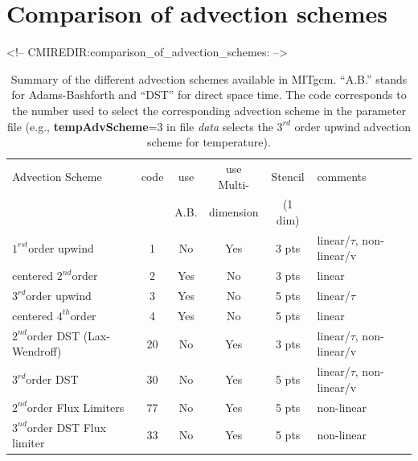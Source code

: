 \section{Comparison of advection schemes}
\label{sec:tracer_advection_schemes}
\begin{rawhtml}
<!-- CMIREDIR:comparison_of_advection_schemes: -->
\end{rawhtml}

\begin{table}[htb]
\centering
 \begin{tabular}[htb]{|l|c|c|c|c|l|}
   \hline
   Advection Scheme & code & use  & use Multi- & Stencil & comments \\
                    &      & A.B. & dimension & (1 dim) & \\
   \hline \hline
   $1^{rst}$order upwind  & 1 &  No & Yes & 3 pts & linear/$\tau$, non-linear/v\\
   \hline
   centered $2^{nd}$order & 2 &  Yes & No & 3 pts & linear \\
   \hline
   $3^{rd}$order upwind   & 3 &  Yes & No & 5 pts & linear/$\tau$\\
   \hline
   centered $4^{th}$order & 4 &  Yes & No & 5 pts & linear \\
   \hline \hline
   $2^{nd}$order DST (Lax-Wendroff)  & 20 &
                         No & Yes & 3 pts & linear/$\tau$, non-linear/v\\
   \hline
   $3^{rd}$order DST & 30 &  No & Yes & 5 pts & linear/$\tau$, non-linear/v\\
   \hline \hline
   $2^{nd}$order Flux Limiters & 77 &  No & Yes & 5 pts & non-linear \\
   \hline
   $3^{nd}$order DST Flux limiter & 33 &  No & Yes & 5 pts & non-linear \\
   \hline
 \end{tabular}
 \caption{Summary of the different advection schemes available in MITgcm.
          ``A.B.'' stands for Adams-Bashforth and ``DST'' for direct space time.
          The code corresponds to the number used to select the corresponding
          advection scheme in the parameter file (e.g., {\bf tempAdvScheme}=3 in
          file {\em data} selects the $3^{rd}$ order upwind advection scheme 
          for temperature).
   }
 \label{tab:advectionShemes_summary}
\end{table}


